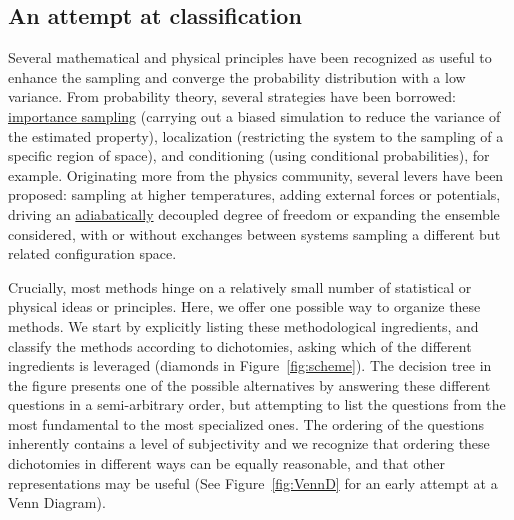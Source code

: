 \documentclass[9pt,review]{livecoms}
\begin{document}
\subsection{An attempt at classification}

Several mathematical and physical principles have been recognized as useful to enhance the sampling and converge the probability distribution with a low variance.
From probability theory, several strategies have been borrowed: \hyperlink{ref:IS}{importance sampling} (carrying out a biased simulation to reduce the variance of the estimated property), localization (restricting the system to the sampling of a specific region of space), and conditioning (using conditional probabilities), for example. Originating more from the physics community, several levers have been proposed: sampling at higher temperatures, adding external forces or potentials, driving an \hyperlink{ref:AdiabaticDyn} {adiabatically} decoupled degree of freedom or expanding the ensemble considered, with or without exchanges between systems sampling a different but related configuration space.

Crucially, most methods hinge on a relatively small number of statistical or physical ideas or principles. Here, we offer one possible way to organize these methods. We  start by explicitly listing these methodological ingredients, and classify the methods according to dichotomies, asking which of the different ingredients is leveraged (diamonds in Figure~\ref{fig:scheme}). The decision tree in the figure presents one of the possible alternatives by answering these different questions in a semi-arbitrary order, but attempting to list the questions from the most fundamental to the most specialized ones. The ordering of the questions inherently contains a level of subjectivity and we recognize that ordering these dichotomies in different ways can be equally reasonable, and that other representations may be useful (See Figure~\ref{fig:VennD} for an early attempt at a Venn Diagram).
\end{document}
